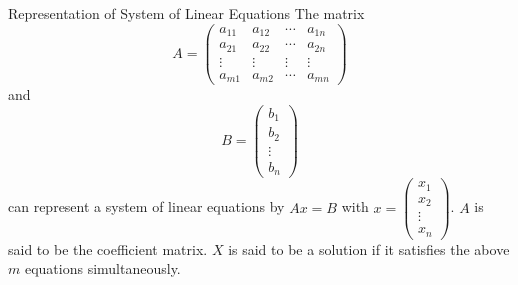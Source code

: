 \begin{defn}{Representation of System of Linear Equations}{} The matrix $$A=
\begin{pmatrix}
a_{11}&a_{12}&\cdots&a_{1n}\\
a_{21}&a_{22}&\cdots&a_{2n}\\
\vdots&\vdots&\vdots&\vdots\\
a_{m1}&a_{m2}&\cdots&a_{mn}
\end{pmatrix}$$ and $$B=
\begin{pmatrix}
b_1\\
b_2\\
\vdots\\
b_n
\end{pmatrix}$$ can represent a system of linear equations by $Ax=B$ with $x=
\begin{pmatrix}
x_1\\
x_2\\
\vdots\\
x_n
\end{pmatrix}$. $A$ is said to be the coefficient matrix. $X$ is said to be a solution if it satisfies the above $m$ equations simultaneously. 
\end{defn}